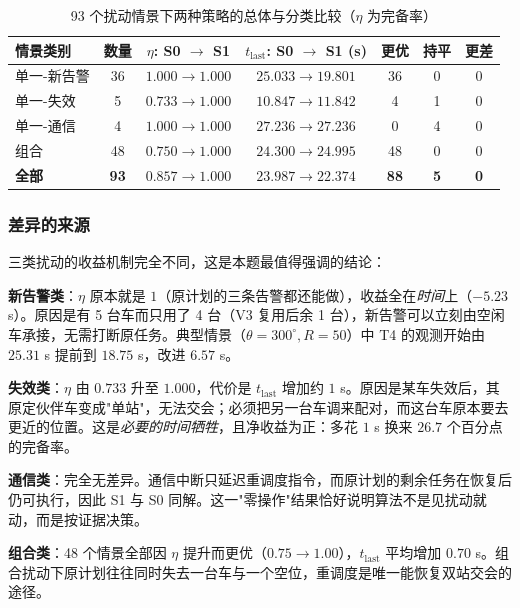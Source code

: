 \documentclass[UTF8,a4paper,zihao=-4,oneside]{ctexart}
\begin{document}
\begin{table}[htbp]
  \centering
  \caption{93 个扰动情景下两种策略的总体与分类比较（$\eta$ 为完备率）}
  \label{tab:q4}
  \small
  \begin{tabular}{lcccccc}
    \toprule
    情景类别 & 数量 & $\eta$: S0 $\to$ S1 & $t_{\mathrm{last}}$: S0 $\to$ S1 (s) & 更优 & 持平 & 更差 \\
    \midrule
    单一-新告警 & 36 & $1.000\to1.000$ & $25.033\to19.801$ & 36 & 0 & 0 \\
    单一-失效 & 5 & $0.733\to1.000$ & $10.847\to11.842$ & 4 & 1 & 0 \\
    单一-通信 & 4 & $1.000\to1.000$ & $27.236\to27.236$ & 0 & 4 & 0 \\
    组合 & 48 & $0.750\to1.000$ & $24.300\to24.995$ & 48 & 0 & 0 \\
    \midrule
    \textbf{全部} & \textbf{93} & $\bm{0.857\to1.000}$ & $\bm{23.987\to22.374}$ & \textbf{88} & \textbf{5} & \textbf{0} \\
    \bottomrule
  \end{tabular}
\end{table}

\subsubsection{差异的来源}

三类扰动的收益机制完全不同，这是本题最值得强调的结论：

\textbf{新告警类}：$\eta$ 原本就是 $1$（原计划的三条告警都还能做），收益全在\emph{时间}上（$-5.23$ s）。原因是有 5 台车而只用了 4 台（V3 复用后余 1 台），新告警可以立刻由空闲车承接，无需打断原任务。典型情景（$\theta=300^\circ,R=50$）中 T4 的观测开始由 $25.31$ s 提前到 $18.75$ s，改进 $6.57$ s。

\textbf{失效类}：$\eta$ 由 $0.733$ 升至 $1.000$，代价是 $t_{\mathrm{last}}$ 增加约 $1$ s。原因是某车失效后，其原定伙伴车变成"单站"，无法交会；必须把另一台车调来配对，而这台车原本要去更近的位置。这是\emph{必要的时间牺牲}，且净收益为正：多花 $1$ s 换来 $26.7$ 个百分点的完备率。

\textbf{通信类}：完全无差异。通信中断只延迟重调度指令，而原计划的剩余任务在恢复后仍可执行，因此 S1 与 S0 同解。这一"零操作"结果恰好说明算法不是见扰动就动，而是按证据决策。

\textbf{组合类}：48 个情景全部因 $\eta$ 提升而更优（$0.75\to1.00$），$t_{\mathrm{last}}$ 平均增加 $0.70$ s。组合扰动下原计划往往同时失去一台车与一个空位，重调度是唯一能恢复双站交会的途径。
\end{document}
